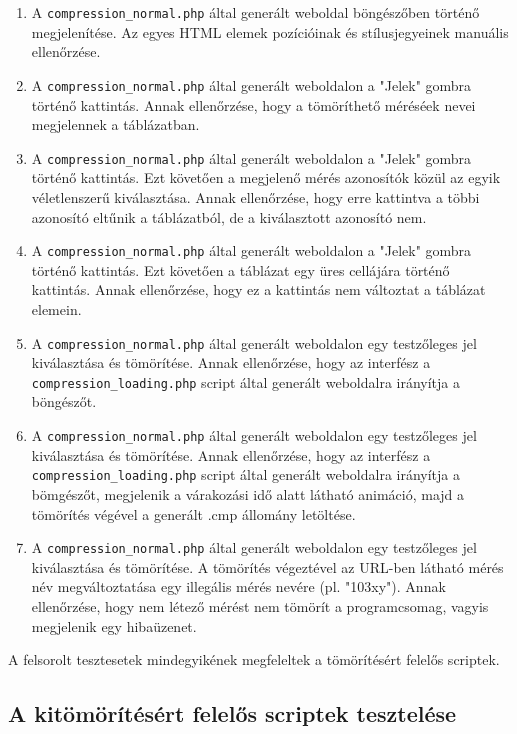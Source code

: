 \documentclass[oneside,titlepage,12pt,a4paper]{report}
\begin{document}
\begin{enumerate}
\item A \texttt{compression\_normal.php} által generált weboldal böngészőben történő megjelenítése. Az egyes HTML elemek pozícióinak és stílusjegyeinek manuális ellenőrzése.
\item A \texttt{compression\_normal.php} által generált weboldalon a "Jelek" gombra történő kattintás. Annak ellenőrzése, hogy a tömöríthető méréséek nevei megjelennek a táblázatban.
\item A \texttt{compression\_normal.php} által generált weboldalon a "Jelek" gombra történő kattintás. Ezt követően a megjelenő mérés azonosítók közül az egyik véletlenszerű kiválasztása. Annak ellenőrzése, hogy erre kattintva a többi azonosító eltűnik a táblázatból, de a kiválasztott azonosító nem.
\item A \texttt{compression\_normal.php} által generált weboldalon a "Jelek" gombra történő kattintás. Ezt követően a táblázat egy üres cellájára történő kattintás. Annak ellenőrzése, hogy ez a kattintás nem változtat a táblázat elemein.
\item A \texttt{compression\_normal.php} által generált weboldalon egy testzőleges jel kiválasztása és tömörítése. Annak ellenőrzése, hogy az interfész a \texttt{compression\_loading.php} script által generált weboldalra irányítja a böngészőt.

\item A \texttt{compression\_normal.php} által generált weboldalon egy testzőleges jel kiválasztása és tömörítése. Annak ellenőrzése, hogy az interfész a \texttt{compression\_loading.php} script által generált weboldalra irányítja a bömgészőt, megjelenik a várakozási idő alatt látható animáció, majd a tömörítés végével a generált .cmp állomány letöltése. 

\item A \texttt{compression\_normal.php} által generált weboldalon egy testzőleges jel kiválasztása és tömörítése. A tömörítés végeztével az URL-ben látható mérés név megváltoztatása egy illegális mérés nevére (pl. "103xy"). Annak ellenőrzése, hogy nem létező mérést nem tömörít a programcsomag, vagyis megjelenik egy hibaüzenet.

\end{enumerate}

A felsorolt tesztesetek mindegyikének megfeleltek a tömörítésért felelős scriptek.


\subsection{A kitömörítésért felelős scriptek tesztelése}
\end{document}
